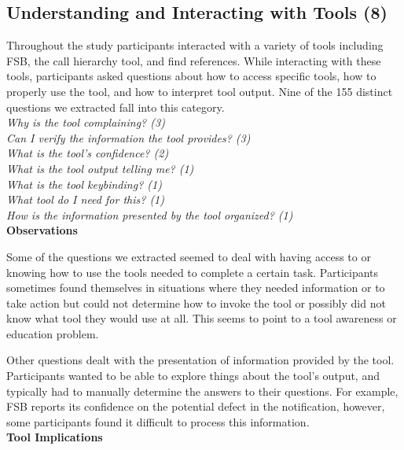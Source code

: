 \documentclass[conference]{IEEEtran}
\begin{document}

\noindent\subsection{\textbf{Understanding and Interacting with Tools (8)}}\label{uit}

Throughout the study participants interacted with a variety of tools including FSB, the call hierarchy tool, and find references. 
While interacting with these tools, participants asked questions about how to access specific tools, how to properly use the tool, and how to interpret tool output. 
Nine of the 155 distinct questions we extracted fall into this category.
\\

\noindent\emph{Why is the tool complaining? (3)} \\
\emph{Can I verify the information the tool provides? (3)} \\
\emph{What is the tool's confidence? (2)} \\
\emph{What is the tool output telling me? (1)} \\
\emph{What is the tool keybinding? (1)} \\
\emph{What tool do I need for this? (1)} \\
\emph{How is the information presented by the tool organized? (1)} \\


\noindent\textbf{Observations}

Some of the questions we extracted seemed to deal with having access to or knowing how to use the tools needed to complete a certain task. 
Participants sometimes found themselves in situations where they needed information or to take action but could not determine how to invoke the tool or possibly did not know what tool they would use at all. 
This seems to point to a tool awareness or education problem.

Other questions dealt with the presentation of information provided by the tool. 
Participants wanted to be able to explore things about the tool's output, and typically had to manually determine the answers to their questions. 
For example, FSB reports its confidence on the potential defect in the notification, however, some participants found it difficult to process this information.
\\


\noindent\textbf{Tool Implications}
\end{document}
